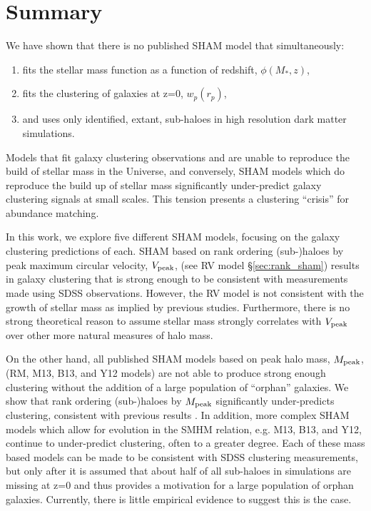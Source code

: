 \documentclass[a4paper,fleqn,usenatbib]{mnras}
\begin{document}
\section{Summary}

We have shown that there is no published SHAM model that simultaneously:
\begin{enumerate}
\item fits the stellar mass function as a function of redshift, $\phi(M_*,z)$,
\item fits the clustering of galaxies at z=0, $w_p(r_p)$,
\item and uses only identified, extant, sub-haloes in high resolution dark matter simulations.
\end{enumerate}
Models that fit galaxy clustering observations and are unable to reproduce the build of stellar mass in the Universe, and conversely, SHAM models which do reproduce the build up of stellar mass significantly under-predict galaxy clustering signals at small scales.  This tension presents a clustering ``crisis'' for abundance matching.   

In this work, we explore five different SHAM models, focusing on the galaxy clustering predictions of each.  SHAM based on rank ordering (sub-)haloes by peak maximum circular velocity, $V_{\rm peak}$, (see RV model \S \ref{sec:rank_sham}) results in galaxy clustering that is strong enough to be consistent with measurements made using SDSS observations.  However, the RV model is not consistent with the growth of stellar mass as implied by previous studies.  Furthermore, there is no strong theoretical reason to assume stellar mass strongly correlates with $V_{\rm peak}$ over other more natural measures of halo mass.

On the other hand, all published SHAM models based on peak halo mass, $M_{\rm peak}$, (RM, M13, B13, and Y12 models) are not able to produce strong enough clustering without the addition of a large population of ``orphan'' galaxies.  We show that rank ordering (sub-)haloes by $M_{\rm peak}$ significantly under-predicts clustering, consistent with previous results \citep[e.g.][]{Reddick:2013gi}.  In addition, more complex SHAM models which allow for evolution in the SMHM relation, e.g. M13, B13, and Y12, continue to under-predict clustering, often to a greater degree.  Each of these mass based models can be made to be consistent with SDSS clustering measurements, but only after it is assumed that about half of all sub-haloes in simulations are missing at z=0 and thus provides a motivation for a large population of orphan galaxies. Currently, there is little empirical evidence to suggest this is the case.
\end{document}
